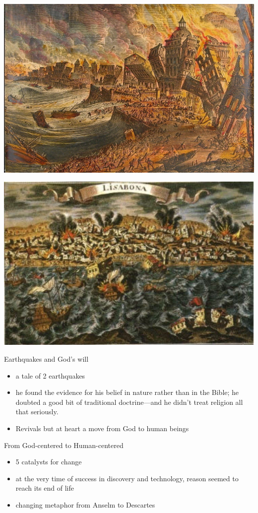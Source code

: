 \begin{frame}[label=sec-1-3]{}
\includegraphics[width=.9\linewidth]{./img/lisbon-burning.jpeg}
\end{frame}

\begin{frame}[label=sec-1-4]{}
\includegraphics[width=.9\linewidth]{./img/Lisbon-earthquake-1755.jpg}
\end{frame}

\begin{frame}[label=sec-1-5]{Earthquakes and God's will}
\begin{itemize}
\item a tale of 2 earthquakes
\item he found the evidence for his belief in nature rather than in the Bible; he doubted a good bit of traditional doctrine—and he didn’t treat religion all that seriously.
\item Revivals but at heart a move from God to human beings
\end{itemize}
\end{frame}
\begin{frame}[label=sec-1-6]{From God-centered to Human-centered}
\begin{itemize}
\item 5 catalysts for change
\item at the very time of success in discovery and technology, reason seemed to reach its end of life
\item changing metaphor from Anselm to Descartes
\end{itemize}
\end{frame}

